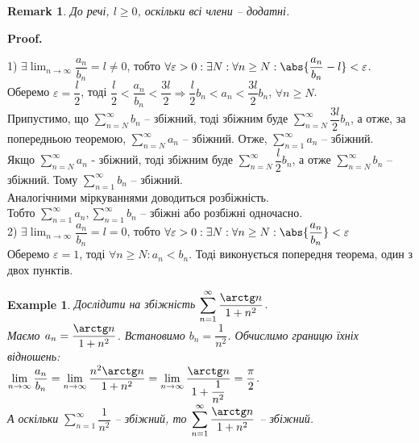 \documentclass[a4paper, 10pt]{article}
\makeatletter
\def\huge{\displaystyle}
\def\qed{$\blacksquare$}
\theoremstyle{theoremdd}
\theoremstyle{theoremdd}
\theoremstyle{theoremdd}
\theoremstyle{theoremdd}
\theoremstyle{theoremdd}
\newtheorem{example}[theorem]{Example}
\theoremstyle{theoremdd}
\theoremstyle{theoremdd}
\newtheorem{remark}[theorem]{Remark}
\theoremstyle{theoremdd}
\theoremstyle{theoremdd}
\renewenvironment{proof}[1][Proof.\\]{\par
\pushQED{\hfill \qed}%
\normalfont \topsep6\p@\@plus6\p@\relax
\trivlist
\item\relax
{\bfseries
#1\@addpunct{.}}\hspace\labelsep\ignorespaces
}{%
\popQED\endtrivlist\@endpefalse
}
\makeatother
\begin{document}
\begin{remark}
До речі, $l \geq 0$, оскільки всі члени -- додатні.
\end{remark}

\begin{proof}
1) $\exists \huge \lim_{n \to \infty} \dfrac{a_n}{b_n} = l \neq 0$, тобто $\forall \varepsilon > 0: \exists N: \forall n \geq N: \abs{\dfrac{a_n}{b_n}-l} < \varepsilon$.\\
Оберемо $\varepsilon = \dfrac{l}{2}$, тоді $\dfrac{l}{2} < \dfrac{a_n}{b_n} < \dfrac{3l}{2} \Rightarrow \dfrac{l}{2}b_n < a_n < \dfrac{3l}{2} b_n$, $\forall n \geq N$.\\
Припустимо, що $\huge \sum_{n=N}^{\infty} b_n$ -- збіжний, тоді збіжним буде $\huge \sum_{n=N}^{\infty} \dfrac{3l}{2} b_n$, а отже, за попередньою теоремою, $\huge \sum_{n=N}^{\infty} a_n$ -- збіжний. Отже, $\huge\sum_{n=1}^\infty a_n$ -- збіжний.\\
Якщо $\huge\sum_{n = N}^\infty a_n$ - збіжний, тоді збіжним буде $\huge\sum_{n = N}^\infty \dfrac{l}{2} b_n$, а отже $\huge\sum_{n=N}^\infty b_n$ -- збіжний. Тому $\huge\sum_{n=1}^\infty b_n$ -- збіжний.\\
Аналогічними міркуваннями доводиться розбіжність.\\
Тобто $\huge\sum_{n=1}^\infty a_n, \huge\sum_{n=1}^\infty b_n$ -- збіжні або розбіжні одночасно.
\bigskip \\
2) $\exists \huge \lim_{n \to \infty} \dfrac{a_n}{b_n} = l = 0$, тобто $\forall \varepsilon > 0: \exists N: \forall n \geq N: \abs{\dfrac{a_n}{b_n}} < \varepsilon$\\
Оберемо $\varepsilon = 1$, тоді $\forall n \geq N: a_n < b_n$. Тоді виконується попередня теорема, один з двох пунктів.
\end{proof}

\begin{example}
Дослідити на збіжність $\huge\sum_{n=1}^\infty \dfrac{\arctg n}{1+n^2}$.\\
Маємо $a_n = \dfrac{\arctg n}{1+n^2}$. Встановимо $b_n = \dfrac{1}{n^2}$. Обчислимо границю їхніх відношень:\\
$\huge\lim_{n \to \infty} \dfrac{a_n}{b_n} = \lim_{n \to \infty} \dfrac{n^2 \arctg n}{1+n^2} = \lim_{n \to \infty} \dfrac{\arctg n}{1 + \dfrac{1}{n^2}} = \dfrac{\pi}{2}$.\\
А оскільки $\huge\sum_{n=1}^\infty \dfrac{1}{n^2}$ -- збіжний, то $\huge\sum_{n=1}^\infty \dfrac{\arctg n}{1+n^2}$ -- збіжний.
\end{example}
\end{document}
